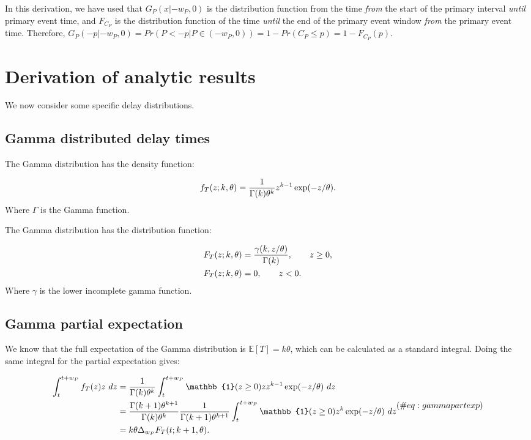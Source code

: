 \documentclass[10pt,letterpaper]{article}
\begin{document}
In this derivation, we have used that $G_P(x|-w_P, 0)$ is the distribution function from the time \textit{from} the start of the primary interval \textit{until} primary event time, and $F_{C_P}$ is the distribution function of the time \textit{until} the end of the primary event window \textit{from} the primary event time. Therefore, $G_P(-p|-w_P, 0) = Pr(P < -p | P \in (-w_P, 0)) = 1 - Pr(C_P \leq p) = 1 - F_{C_P}(p)$.

\section{Derivation of analytic results}

We now consider some specific delay distributions.

\subsection{Gamma distributed delay times}

The Gamma distribution has the density function:

\begin{equation}
f_T(z;k, \theta) = {1 \over \Gamma(k) \theta^k} z^{k-1} \exp(-z/\theta).
\end{equation}
Where $\Gamma$ is the Gamma function.

The Gamma distribution has the distribution function:

\begin{equation}
\begin{aligned}
F_T(z;k, \theta) &= {\gamma(k, z/\theta) \over \Gamma(k)}, \qquad z\geq 0,\\
F_T(z;k, \theta) &= 0, \qquad z < 0.
\end{aligned}
\end{equation}
Where $\gamma$ is the lower incomplete gamma function.

\subsection{Gamma partial expectation}

We know that the full expectation of the Gamma distribution is $\mathbb{E}[T] = k\theta$, which can be calculated as a standard integral. Doing the same integral for the partial expectation gives:

\begin{equation}
\begin{aligned}
\int_t^{t+w_P} f_T(z) z~ dz &= {1 \over \Gamma(k) \theta^k} \int_t^{t+w_P} \mathbb{1}(z \geq 0)  z  z^{k-1} \exp(-z/\theta)~dz \\
&=  {\Gamma(k+1) \theta^{k+1} \over \Gamma(k) \theta^k}  {1 \over \Gamma(k+1) \theta^{k+1}} \int_t^{t+w_P} \mathbb{1}(z \geq 0)  z^{k}  \exp(-z/\theta)~dz\\
&= k\theta \Delta_{w_P} F_T(t; k + 1, \theta).
\end{aligned} (\#eq:gammapartexp)
\end{equation}
\end{document}
